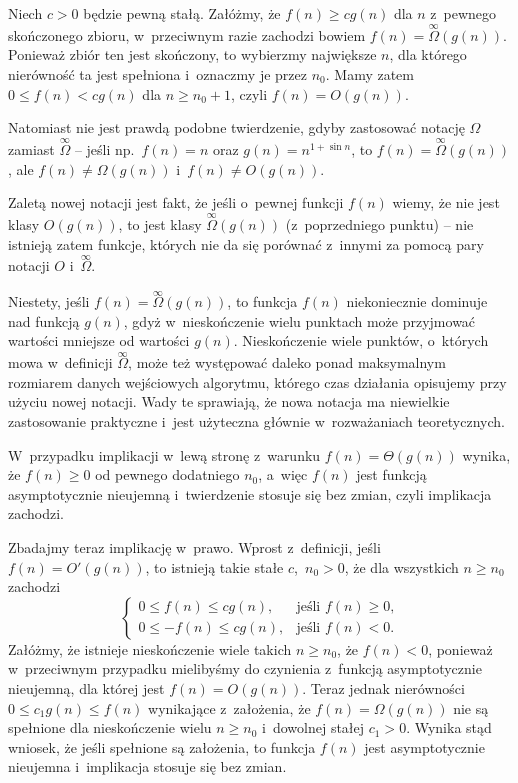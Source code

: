 \subproblem %
Niech $c>0$ będzie pewną stałą. Załóżmy, że $f(n)\ge cg(n)$ dla $n$ z~pewnego skończonego zbioru, w~przeciwnym razie zachodzi bowiem $f(n)=\overset{\infty}{\Omega}(g(n))$. Ponieważ zbiór ten jest skończony, to wybierzmy największe $n$, dla którego nierówność ta jest spełniona i~oznaczmy je przez $n_0$. Mamy zatem $0\le f(n)<cg(n)$ dla $n\ge n_0+1$, czyli $f(n)=O(g(n))$.

Natomiast nie jest prawdą podobne twierdzenie, gdyby zastosować notację $\Omega$ zamiast $\overset{\infty}{\Omega}$ -- jeśli np.\ $f(n)=n$ oraz $g(n)=n^{1+\sin n}$, to $f(n)=\overset{\infty}{\Omega}(g(n))$, ale $f(n)\ne\Omega(g(n))$ i~$f(n)\ne O(g(n))$.

\subproblem %
Zaletą nowej notacji jest fakt, że jeśli o~pewnej funkcji $f(n)$ wiemy, że nie jest klasy $O(g(n))$, to jest klasy $\overset{\infty}{\Omega}(g(n))$ (z~poprzedniego punktu) -- nie istnieją zatem funkcje, których nie da się porównać z~innymi za pomocą pary notacji $O$ i~$\overset{\infty}{\Omega}$.

Niestety, jeśli $f(n)=\overset{\infty}{\Omega}(g(n))$, to funkcja $f(n)$ niekoniecznie dominuje nad funkcją $g(n)$, gdyż w~nieskończenie wielu punktach może przyjmować wartości mniejsze od wartości $g(n)$. Nieskończenie wiele punktów, o~których mowa w~definicji $\overset{\infty}{\Omega}$, może też występować daleko ponad maksymalnym rozmiarem danych wejściowych algorytmu, którego czas działania opisujemy przy użyciu nowej notacji. Wady te sprawiają, że nowa notacja ma niewielkie zastosowanie praktyczne i~jest użyteczna głównie w~rozważaniach teoretycznych.

\subproblem %
W~przypadku implikacji w~lewą stronę z~warunku $f(n)=\Theta(g(n))$ wynika, że $f(n)\ge0$ od pewnego dodatniego $n_0$, a~więc $f(n)$ jest funkcją asymptotycznie nieujemną i~twierdzenie stosuje się bez zmian, czyli implikacja zachodzi.

Zbadajmy teraz implikację w~prawo. Wprost z~definicji, jeśli $f(n)=O'(g(n))$, to istnieją takie stałe $c$,~$n_0>0$, że dla wszystkich $n\ge n_0$ zachodzi
\[
	\begin{cases}
		0 \le f(n) \le cg(n), & \text{jeśli $f(n)\ge0$,} \\
		0 \le -f(n) \le cg(n), & \text{jeśli $f(n)<0$.}
	\end{cases}
\]
Załóżmy, że istnieje nieskończenie wiele takich $n\ge n_0$, że $f(n)<0$, ponieważ w~przeciwnym przypadku mielibyśmy do czynienia z~funkcją asymptotycznie nieujemną, dla której jest $f(n)=O(g(n))$. Teraz jednak nierówności $0\le c_1g(n)\le f(n)$ wynikające z~założenia, że $f(n)=\Omega(g(n))$ nie są spełnione dla nieskończenie wielu $n\ge n_0$ i~dowolnej stałej $c_1>0$. Wynika stąd wniosek, że jeśli spełnione są założenia, to funkcja $f(n)$ jest asymptotycznie nieujemna i~implikacja stosuje się bez zmian.

